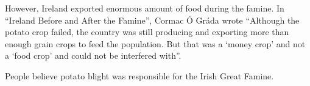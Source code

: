 However, Ireland exported enormous amount of food during the famine. In ``Ireland Before and After the Famine'', Cormac Ó Gráda wrote ``Although the potato crop failed, the country was still producing and exporting more than enough grain crops to feed the population. But that was a `money crop' and not a `food crop' and could not be interfered with''.

People believe potato blight was responsible for the Irish Great Famine. 
